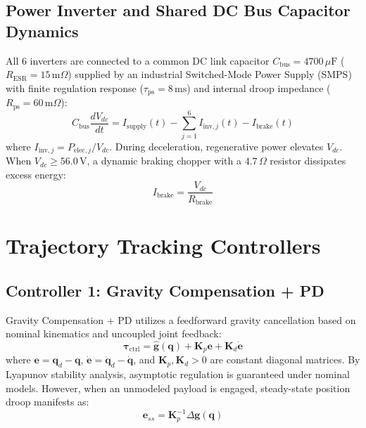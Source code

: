 \documentclass[journal,10pt,twocolumn]{IEEEtran}
\begin{document}
\subsection{Power Inverter and Shared DC Bus Capacitor Dynamics}
All 6 inverters are connected to a common DC link capacitor $C_{\text{bus}} = 4700\,\mu\text{F}$ ($R_{\text{ESR}} = 15\,\text{m}\Omega$) supplied by an industrial Switched-Mode Power Supply (SMPS) with finite regulation response ($\tau_{\text{ps}} = 8\,\text{ms}$) and internal droop impedance ($R_{\text{ps}} = 60\,\text{m}\Omega$):
\begin{equation}
    C_{\text{bus}} \frac{dV_{dc}}{dt} = I_{\text{supply}}(t) - \sum_{j=1}^6 I_{\text{inv},j}(t) - I_{\text{brake}}(t)
\end{equation}
where $I_{\text{inv},j} = P_{\text{elec},j} / V_{dc}$. During deceleration, regenerative power elevates $V_{dc}$. When $V_{dc} \ge 56.0\,\text{V}$, a dynamic braking chopper with a $4.7\,\Omega$ resistor dissipates excess energy:
\begin{equation}
    I_{\text{brake}} = \frac{V_{dc}}{R_{\text{brake}}}
\end{equation}

\section{Trajectory Tracking Controllers}

\subsection{Controller 1: Gravity Compensation + PD}
Gravity Compensation + PD utilizes a feedforward gravity cancellation based on nominal kinematics and uncoupled joint feedback:
\begin{equation}
    \bm{\tau}_{\text{ctrl}} = \hat{\bm{g}}(\bm{q}) + \bm{K}_p \bm{e} + \bm{K}_d \dot{\bm{e}}
\end{equation}
where $\bm{e} = \bm{q}_d - \bm{q}$, $\dot{\bm{e}} = \dot{\bm{q}}_d - \dot{\bm{q}}$, and $\bm{K}_p, \bm{K}_d > 0$ are constant diagonal matrices. By Lyapunov stability analysis, asymptotic regulation is guaranteed under nominal models. However, when an unmodeled payload is engaged, steady-state position droop manifests as:
\begin{equation}
    \bm{e}_{ss} = \bm{K}_p^{-1} \Delta \bm{g}(\bm{q})
\end{equation}
\end{document}
